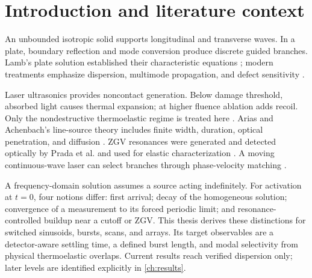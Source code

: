 \chapter{Introduction and literature context}
An unbounded isotropic solid supports longitudinal and transverse waves. In a
plate, boundary reflection and mode conversion produce discrete guided branches.
Lamb's plate solution established their characteristic equations
\cite{lamb1917,viktorov1967}; modern treatments emphasize dispersion, multimode
propagation, and defect sensitivity \cite{graff1975,rose2014}.

Laser ultrasonics provides noncontact generation. Below damage threshold,
absorbed light causes thermal expansion; at higher fluence ablation adds recoil.
Only the nondestructive thermoelastic regime is treated here \cite{scruby1990}.
Arias and Achenbach's line-source theory includes finite width, duration, optical
penetration, and diffusion \cite{arias2003}. ZGV resonances were generated and
detected optically by Prada et al. \cite{prada2005} and used for elastic
characterization \cite{clorennec2007}. A moving continuous-wave laser can select
branches through phase-velocity matching \cite{li2018}.

A frequency-domain solution assumes a source acting indefinitely. For activation
at $t=0$, four notions differ: first arrival; decay of the homogeneous solution;
convergence of a measurement to its forced periodic limit; and resonance-
controlled buildup near a cutoff or ZGV. This thesis derives these distinctions
for switched sinusoids, bursts, scans, and arrays. Its target observables are a
detector-aware settling time, a defined burst length, and modal selectivity from
physical thermoelastic overlaps. Current results reach verified dispersion only;
later levels are identified explicitly in \cref{ch:results}.
